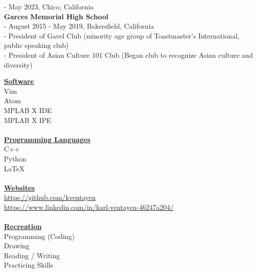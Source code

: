 \documentclass[10pt, letterpaper]{article}                %
\begin{document}
\tab \tab - May 2023, Chico, California\\
\textbf{Garces Memorial High School}\\
\tab \tab - August 2015 - May 2019, Bakersfield, California\\
\tab \tab - President of Gavel Club (minority age group of Toastmaster's International, public speaking club)\\
\tab \tab - President of Asian Culture 101 Club (Began club to recognize Asian culture and diversity)\\
\begin{multicols}{2}
\noindent\textbf{\large \underline{Software}}\\
\tab \tab Vim\\
\tab \tab Atom\\
\tab \tab MPLAB X IDE\\
\tab \tab MPLAB X IPE\\
\\
\textbf{\large \underline{Programming Languages}}\\
\tab \tab C++\\
\tab \tab Python\\
\tab \tab LaTeX\\
\columnbreak
\\
\textbf{\large \underline{Websites}}\\
\tab \tab \url{https://github.com/kventayen}\\
\tab \tab \url{https://www.linkedin.com/in/karl-ventayen-46247a204/}\\
\\
\textbf{\large \underline{Recreation}}\\
\tab \tab Programming (Coding)\\
\tab \tab Drawing\\
\tab \tab Reading / Writing\\
\tab \tab Practicing Skills
\end{multicols}
\end{document}
